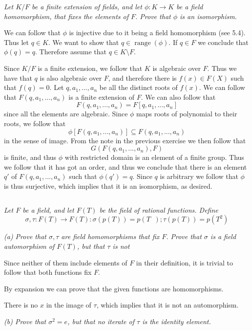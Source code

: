\documentclass[11pt,oneside,titlepage]{book}
\DeclareMathOperator \range {range}
\DeclareMathOperator \inv {^{-1}}
\begin{document}
\textit{Let $K/F$ be a finite extension of fields, and let $\phi: K
  \to K$ be a field homomorphism, that fixes the elements of $F$. Prove
  that $\phi$ is an isomorphism.}

We can follow that $\phi$ is injective due to it being a field
homomorphism (see 5.4). Thus let $q \in K$. We want to show that $q
\in \range(\phi)$. If $q \in F$ we conclude that $\phi(q) =
q$. Therefore assume that $q \in K \setminus F$.

Since $K/F$ is a finite extension, we follow that $K$ is algebraic
over $F$. Thus we have that $q$ is also algebraic over $F$, and therefore
there is $f(x) \in F(X)$ such that $f(q) = 0$. Let $q, a_1, ..., a_n$
be all the distinct roots of $f(x)$. We can follow that
$F(q, a_1, ..., a_n)$ is a finite extension of $F$. We can also follow that
$$F(q, a_1, ..., a_n) = F[q, a_1, ..., a_n]$$
since all the elements are algebraic. Since $\phi$ maps roots of polynomial
to their roots, we follow that
$$\phi[F(q, a_1, ..., a_n)] \subseteq F(q, a_1, ..., a_n)$$
in the sense of image. From the note in the previous exercise we then
follow that
$$G(F(q, a_1, ..., a_n), F)$$
is finite, and thus $\phi$ with restricted domain is an element of a
finite group.  Thus we follow that it has got an order, and thus we
conclude that there is an element $q'$ of $F(q, a_1, ..., a_n)$ such
that $\phi(q') = q$.  Since $q$ is arbitrary we follow that $\phi$ is
thus surjective, which implies that it is an isomorphism, as desired.


\subsection{}

\textit{Let $F$ be a field, and let $F(T)$ be the field of rational
functions. Define
  $$\sigma, \tau: F(T) \to F(T): \sigma(p(T)) = p(T\inv); \tau(p(T)) = p(T^2)$$}

\textit{(a) Prove that $\sigma, \tau$ are field homomorphisms that fix
$F$. Prove that $\sigma$ is a field automorphism of $F(T)$, but that
$\tau$ is not}

Since neither of them include elements of $F$ in their definition, it
is trivial to follow that both functions fix $F$.

By expansion we can prove that the given functions are homomorphisms.

There is no $x$ in the image of $\tau$, which implies that it is not
an automorphism.

\textit{(b) Prove that $\sigma^2 = e$, but that no iterate of $\tau$
  is the identity element.}
\end{document}
